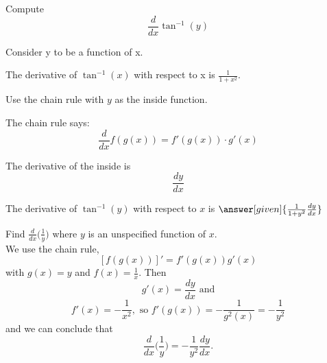\documentclass{ximera}
\begin{document}
\begin{question} %
  Compute
  \[
  \frac{d}{dx} \tan^{-1}(y)
  \]
  
	  
    \begin{hint}
      Consider y to be a function of x.
    \end{hint}
		\begin{hint}
     The derivative of $\tan^{-1}(x)$ with respect to x is $\frac{1}{1+x^2}$.
    \end{hint}
    \begin{hint}
      Use the chain rule with $y$ as the inside function.
    \end{hint}
    \begin{hint}
      The chain rule says:
      \[
      \frac{d}{dx} f(g(x)) = f'(g(x))\cdot g'(x)
      \]
    \end{hint}
    \begin{hint}
      The derivative of the inside is 
      \[
      \frac{dy}{dx}
      \]
    \end{hint}
    
		The derivative of $\tan^{-1}(y)$ with respect to $x$ is
		 $\answer[given]{\frac{1}{1+y^2} \frac{dy}{dx}}$
		
\end{question}



\begin{example} %
Find $\frac{d}{dx} \big(\frac{1}{y}\big)$ where $y$ is an unspecified function of $x$.\\
We use the chain rule,
\[\displaystyle{[f(g(x))]' = f'(g(x))g'(x)}\]
with $g(x) = y$ and $f(x) = \frac{1}{x}$. Then 
\[g'(x) = \frac{dy}{dx} \text{ and}\]
\[f'(x) = -\frac{1}{x^2}, \text{ so } f'(g(x)) = -\frac{1}{g^2(x)} = -\frac{1}{y^2}\]
and we can conclude that
\[\frac{d}{dx} \Big(\frac{1}{y}\Big) = -\frac{1}{y^2} \frac{dy}{dx}.\]
\end{example}


\begin{center}
\begin{foldable}
\end{foldable}
\end{center}
\end{document}
